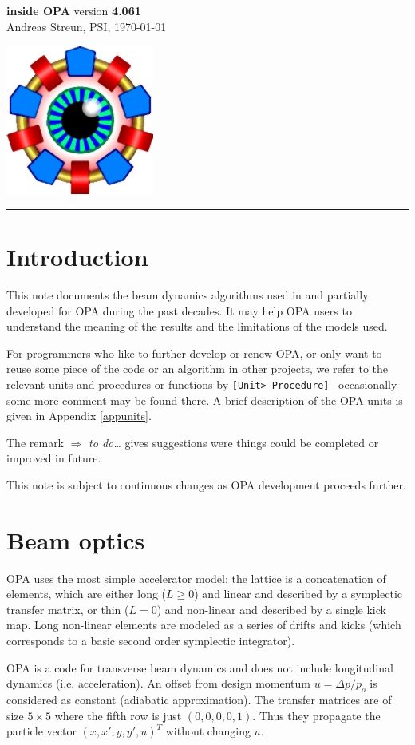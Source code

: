 \documentclass[12pt]{article}
\newcommand\todo[1]{$\Longrightarrow$ {\em #1} }
\newcommand\code[1]{{\tt [#1]}}
\begin{document}
\noindent

\parbox[t]{0.7\hsize}{
  {\Huge\bf inside OPA} version {\bf 4.061}\\
  Andreas Streun, PSI, \today
} \hfill  \includegraphics{opalogo_small.jpg}
\rule{\hsize}{1pt}
\section{Introduction}

This note documents the beam dynamics algorithms used in and partially developed for OPA during the past decades. It may help OPA users to understand the meaning of the results and the limitations of the models used.

For programmers who like to further develop or renew OPA, or only want to reuse some piece of the code or an algorithm in other projects, we refer to the relevant units and procedures or functions by \code{Unit> Procedure}-- occasionally some more comment may be found there. A brief description of the OPA units is given in Appendix \ref{appunits}.

The remark \todo{to do\dots} gives suggestions were things could be completed or improved in future.

This note is subject to continuous changes as OPA development proceeds further.

\section{Beam optics}

OPA uses the most simple accelerator model: the lattice is a concatenation of elements, which are either long ($L\geq 0$) and linear and described by a symplectic transfer matrix, or thin ($L=0$) and non-linear and described by a single kick map. Long non-linear elements are modeled as a series of drifts and kicks (which corresponds to a basic second order symplectic integrator).

OPA is a code for transverse beam dynamics and does not include longitudinal dynamics (i.e. acceleration). An offset from design momentum $u=\Delta p/p_o$ is considered as constant (adiabatic approximation). The transfer matrices are of size $5\times 5$ where the fifth row is just $(0,0,0,0,1)$. Thus they propagate the particle vector $(x,x',y,y',u)^T$ without changing $u$.
\end{document}

